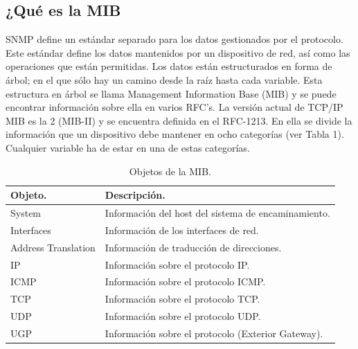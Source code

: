 \subsection{¿Qué es la MIB}

\noindent
SNMP define un estándar separado para los datos gestionados por el protocolo. Este estándar define los datos mantenidos por un dispositivo de red, así como las operaciones que están permitidas. Los datos están estructurados en forma de árbol; en el que sólo hay un camino desde la raíz hasta cada variable. Esta estructura en árbol se llama Management Information Base (MIB) y se puede encontrar información sobre ella en varios RFC's.
\noindent
La versión actual de TCP/IP MIB es la 2 (MIB-II) y se encuentra definida en el RFC-1213. En ella se divide la información que un dispositivo debe mantener en ocho categorías (ver Tabla 1). Cualquier variable ha de estar en una de estas categorías.

\begin{table}[htbp]
	\begin{center}
		\begin{tabular}{|l|l|}
		\hline
		Objeto. 			& Descripción. \\ \hline \hline
		System 				& Información del host del sistema de encaminamiento. 	\\ \hline
		Interfaces 			& Información de los interfaces de red. 				\\ \hline
		Address Translation & Información de traducción de direcciones. 			\\ \hline
		IP 					& Información sobre el protocolo IP. 					\\ \hline
		ICMP 				& Información sobre el protocolo ICMP. 					\\ \hline
		TCP 				& Información sobre el protocolo TCP. 					\\ \hline
		UDP 				& Información sobre el protocolo UDP. 					\\ \hline
		UGP 				& Información sobre el protocolo (Exterior Gateway). 	\\ \hline
		\end{tabular}
	\caption{Objetos de la MIB.}
	\label{tabla:objetos_mib}
	\end{center}
\end{table}

